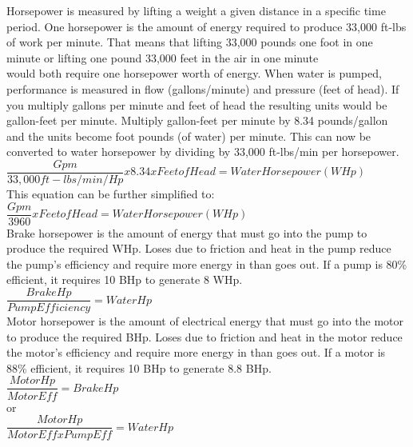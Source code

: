 \documentclass{article}
\begin{document}
Horsepower is measured by lifting a weight a given distance in a specific time period. One horsepower is the amount of energy required to produce 33,000 ft-lbs of work per minute. That means that lifting 33,000 pounds one foot in one minute or lifting one pound 33,000 feet in the air in one minute\\
would both require one horsepower worth of energy. When water is pumped, performance is measured in flow (gallons/minute) and pressure (feet of head). If you multiply gallons per minute and feet of head the resulting units would be gallon-feet per minute. Multiply gallon-feet per minute by 8.34 pounds/gallon and the units become foot pounds (of water) per minute. This can now be converted to water horsepower by dividing by 33,000 ft-lbs/min per horsepower.\\
$\dfrac{Gpm}{33,000 ft-lbs/min/Hp} x 8.34 x Feet of Head = Water Horsepower (WHp)$\\
This equation can be further simplified to:\\
$\dfrac{Gpm}{3960}x Feet of Head = Water Horsepower (WHp)$\\
Brake horsepower is the amount of energy that must go into the pump to produce the required WHp. Loses due to friction and heat in the pump reduce the pump’s efficiency and require more energy in than goes out. If a pump is 80\% efficient, it requires 10 BHp to generate 8 WHp.\\
$\dfrac{BrakeHp}{ Pump Efficiency}= WaterHp$\\
Motor horsepower is the amount of electrical energy that must go into the motor to produce the required BHp. Loses due to friction and heat in the motor reduce the motor’s efficiency and require more energy in than goes out. If a motor is 88\% efficient, it requires 10 BHp to generate 8.8 BHp.\\
$\dfrac{MotorHp}{ Motor Eff} = BrakeHp$\\
or\\
$\dfrac{MotorHp}{ Motor Eff x Pump Eff }= WaterHp$\\
\end{document}

